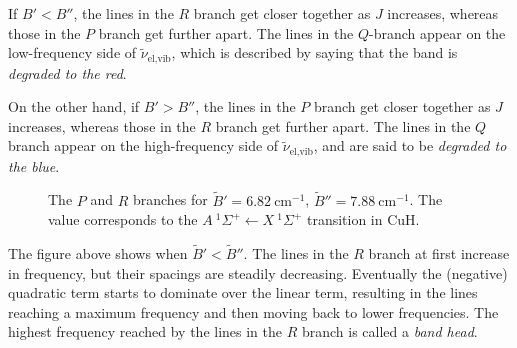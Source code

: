 \documentclass{article}
\theoremstyle{plain}\theoremheaderfont{\normalfont\itshape}\theorembodyfont{\rmfamily}\theoremseparator{.}\newtheorem*{rem}{Remark}\newtheorem*{ex}{Example}\newtheorem*{proof}{Proof}\newtheorem*{altp}{Alternative proof}
\theoremstyle{plain}\theoremheaderfont{\normalfont\bfseries}\theorembodyfont{\rmfamily}\theoremseparator{.}\newtheorem{thm}{Theorem}[section]\newtheorem{lem}[thm]{Lemma}\newtheorem{prop}[thm]{Proposition}\newtheorem*{cor}{Corollary}\newtheorem{defn}[thm]{Definition}\newtheorem{clm}[thm]{Claim}\newtheorem{clminproof}{Claim}\newtheorem{pos}{Postulate}[section]
\theoremstyle{break}\theoremheaderfont{\normalfont\itshape}\theorembodyfont{\rmfamily}\theoremseparator{.\medskip}\newtheorem*{proofskip}{Proof}\newtheorem*{exs}{Examples}\newtheorem*{rems}{Remarks}
\theoremstyle{break}\theoremheaderfont{\normalfont\bfseries}\theorembodyfont{\rmfamily}\theoremseparator{.\medskip}\newtheorem{lemskip}[thm]{Lemma}\newtheorem{defnskip}[thm]{Definition}\newtheorem{propskip}[thm]{Proposition}\newtheorem{thmskip}[thm]{Theorem}
\numberwithin{equation}{section}
\newcommand{\unit}[1]{\ \mathrm{#1}}
\begin{document}
    If \(B'<B''\), the lines in the \(R\) branch get closer together as \(J\) increases, whereas those
    in the \(P\) branch get further apart. The lines in the \(Q\)-branch appear on the low-frequency
    side of \(\tilde{\nu}_{\text{el,vib}}\), which is described by saying that the band is \textit{degraded to the red}.

    On the other hand, if \(B'>B''\), the lines in the \(P\) branch get closer together as \(J\) increases, whereas those in the \(R\) branch get further apart. The lines in the \(Q\) branch appear on the
    high-frequency side of \(\tilde{\nu}_{\text{el,vib}}\), and are said to be \textit{degraded to the blue}.

    \begin{figure}
        \centering
        \caption{The \(P\) and \(R\) branches for \(\tilde{B}'=6.82\unit{cm}^{-1}\), \(\tilde{B}''=7.88\unit{cm}^{-1}\). The value corresponds to the \(A\ ^1\Sigma^+\leftarrow X \ ^1\Sigma^+\) transition in \(\mathrm{CuH}\).}
    \end{figure}

    The figure above shows when \(\tilde{B}'<\tilde{B}''\). The lines in the \(R\) branch at first increase in frequency, but their spacings are steadily decreasing. Eventually the (negative) quadratic term starts to dominate over the linear term, resulting in the lines reaching a maximum frequency and then moving back to lower frequencies. The highest frequency reached by the lines in the \(R\) branch is called a \textit{band head}.
\end{document}
